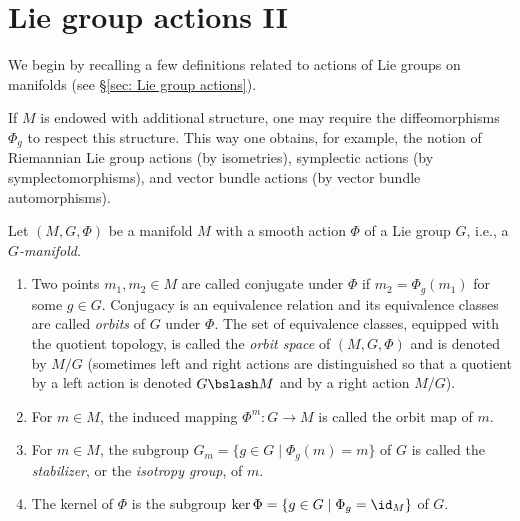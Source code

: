 \section{Lie group actions II}

We begin by recalling a few definitions related to actions of Lie groups on manifolds (see \S\ref{sec: Lie group actions}).


\begin{rem}
    If $M$ is endowed with additional structure, one may require the diffeomorphisms $\Phi_g$ to respect this structure. This way one obtains, for example, the notion of Riemannian Lie group actions (by isometries), symplectic actions (by symplectomorphisms), and vector bundle actions (by vector bundle automorphisms).
\end{rem}


\begin{defn}
    Let $(M,G,\Phi)$ be a manifold $M$ with a smooth action $\Phi$ of a Lie group $G$, i.e., a \emph{$G$-manifold}. 
    \begin{enumerate}
        \item Two points $m_1,m_2\in M$ are called conjugate under $\Phi$ if $m_2=\Phi_g(m_1)$ for some $g\in G$. Conjugacy is an equivalence relation and its equivalence classes are called \emph{orbits} of $G$ under $\Phi$. The set of equivalence classes, equipped with the quotient topology, is called the \emph{orbit space} of $(M,G,\Phi)$ and is denoted by $M\slash G$ (sometimes left and right actions are distinguished so that a quotient by a left action is denoted $G\bslash M$ and by a right action $M\slash G$).
        \item For $m\in M$, the induced mapping $\Phi^m:G\to M$ is called the orbit map of $m$.
        \item For $m\in M$, the subgroup $G_m=\{g\in G\mid \Phi_g(m)=m\}$ of $G$ is called the \emph{stabilizer}, or the \emph{isotropy group}, of $m$.
        \item The kernel of $\Phi$ is the subgroup $\ker\Phi=\{g\in G\mid \Phi_g=\id_M\}$ of $G$.
    \end{enumerate}
\end{defn}

